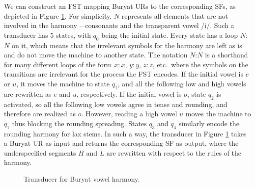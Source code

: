 We can construct an FST mapping Buryat URs to the corresponding SFs, as depicted in Figure \ref{buryattransducera}.
For simplicity, $N$ represents all elements that are not involved in the harmony -- consonants and the transparent vowel /i/.
Such a transducer has $5$ states, with $q_0$ being the initial state.
Every state has a loop $N$:$N$ on it, which means that the irrelevant symbols for the harmony are left as is and do not move the machine to another state.
The notation $N$:$N$ is a shorthand for many different loops of the form $x:x$, $y:y$, $z:z$, etc.\ where the symbols on the transitions are irrelevant for the process the FST encodes.
If the initial vowel is $e$ or $u$, it moves the machine to state $q_1$, and all the following low and high vowels are rewritten as $e$ and $u$, respectively.
If the initial vowel is $o$, state $q_2$ is activated, so all the following low vowels agree in tense and rounding, and therefore are realized as $o$.
However, reading a high vowel $u$ moves the machine to $q_1$ thus blocking the rounding spreading.
States $q_3$ and $q_4$ similarly encode the rounding harmony for lax stems.
In such a way, the transducer in Figure \ref{buryattransducera} takes a Buryat UR as input and returns the corresponding SF as output, where the underspecified segments $H$ and $L$ are rewritten with respect to the rules of the harmony.


\begin{figure}[h!] 
\centering
{}
\caption{Transducer for Buryat vowel harmony.}
\label{buryattransducera}
\end{figure}

